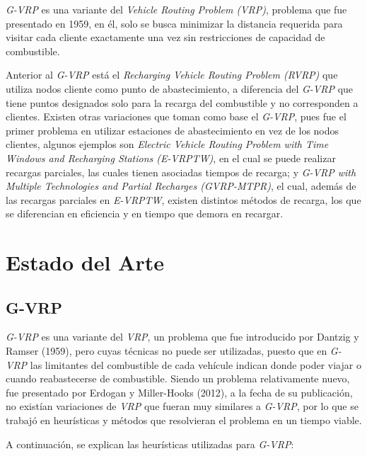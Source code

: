 \documentclass[letter, 10pt]{article}
\begin{document}
\textit{G-VRP} es una variante del \textit{Vehicle Routing Problem (VRP)}\cite{VRP},
 problema que fue presentado en 1959, en él, solo se busca minimizar la distancia requerida para visitar cada cliente exactamente una vez sin restricciones de capacidad de combustible.

Anterior al \textit{G-VRP} está el \textit{Recharging Vehicle Routing Problem (RVRP)} que
utiliza nodos cliente como punto de abastecimiento, a diferencia del \textit{G-VRP} que tiene
puntos designados solo para la recarga del combustible y no corresponden a clientes. 
Existen otras variaciones que toman como base el \textit{G-VRP}, 
pues fue el primer problema en utilizar
estaciones de abastecimiento en vez de los nodos clientes, algunos ejemplos son 
\textit{Electric Vehicle Routing Problem with Time Windows and Recharging Stations (E-VRPTW)}, en el cual se puede realizar recargas parciales, las cuales tienen asociadas tiempos de recarga; y
\textit{G-VRP with Multiple Technologies and Partial Recharges (GVRP-MTPR)}, el cual,
además de las recargas parciales en \textit{E-VRPTW}, existen distintos métodos de recarga, los que
se diferencian en eficiencia y en tiempo que demora en recargar.

\section{Estado del Arte}

\subsection{G-VRP}
\textit{G-VRP} es una variante del \textit{VRP}, un problema que fue introducido por Dantzig y Ramser (1959), pero cuyas técnicas no
puede ser utilizadas, puesto que en \textit{G-VRP} las limitantes del combustible de cada vehícule indican donde poder viajar
o cuando reabastecerse de combustible. Siendo un problema relativamente nuevo, fue presentado por
 Erdogan y Miller-Hooks (2012), a la fecha de su publicación, no existían 
 variaciones de \textit{VRP} que fueran muy similares a \textit{G-VRP}, por lo que se
trabajó en heurísticas y métodos que resolvieran el problema en un tiempo viable.

A continuación, se explican las heurísticas utilizadas para \textit{G-VRP}:
\end{document}

